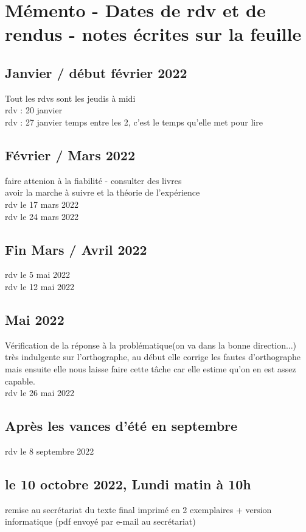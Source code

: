 \documentclass[../main.tex]{subfiles}
\begin{document}
\section{Mémento - Dates de rdv et de rendus - notes écrites sur la feuille}
\subsection{Janvier / début février 2022}
Tout les rdvs sont les jeudis à midi\\
rdv : 20 janvier \\
rdv : 27 janvier \qquad temps entre les 2, c'est le temps qu'elle met pour lire \\
\subsection{Février / Mars 2022}
faire attenion à la fiabilité - consulter des livres\\ 
avoir la marche à suivre et la théorie de l'expérience\\
rdv le 17 mars 2022\\
rdv le 24 mars 2022\\
\subsection{Fin Mars / Avril 2022}
rdv le 5 mai 2022\\
rdv le 12 mai 2022\\
\subsection{Mai 2022}
Vérification de la réponse à la problématique(on va dans la bonne direction...)\\
très indulgente sur l'orthographe, au début elle corrige les fautes d'orthographe mais ensuite elle nous laisse faire cette tâche car elle estime qu'on en est assez capable.\\
rdv le 26 mai 2022\\
\subsection{Après les vances d'été en septembre}
rdv le 8 septembre 2022\\
\subsection{le 10 octobre 2022, Lundi matin à 10h}
remise au secrétariat du texte final imprimé en 2 exemplaires + version informatique (pdf envoyé par e-mail au secrétariat)
\end{document}
